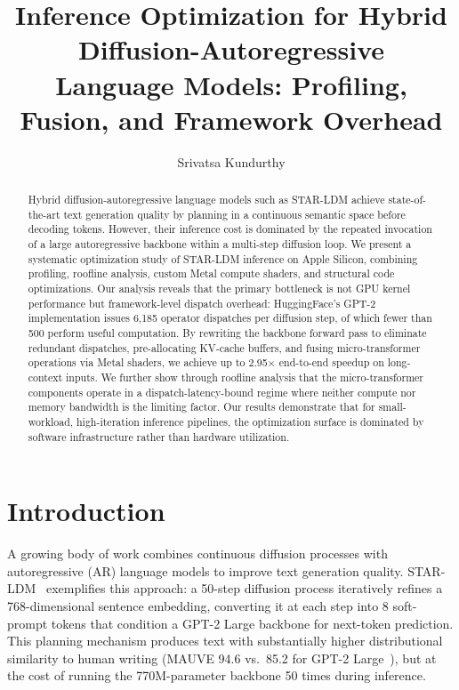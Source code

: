 \documentclass[sigconf,authordraft]{acmart}
\begin{document}
\title{Inference Optimization for Hybrid Diffusion-Autoregressive\\Language Models: Profiling, Fusion, and Framework Overhead}

\author{Srivatsa Kundurthy}

\renewcommand{\shortauthors}{Kundurthy}

\begin{abstract}
Hybrid diffusion-autoregressive language models such as STAR-LDM achieve state-of-the-art text generation quality by planning in a continuous semantic space before decoding tokens. However, their inference cost is dominated by the repeated invocation of a large autoregressive backbone within a multi-step diffusion loop. We present a systematic optimization study of STAR-LDM inference on Apple Silicon, combining profiling, roofline analysis, custom Metal compute shaders, and structural code optimizations. Our analysis reveals that the primary bottleneck is not GPU kernel performance but framework-level dispatch overhead: HuggingFace's GPT-2 implementation issues 6{,}185 operator dispatches per diffusion step, of which fewer than 500 perform useful computation. By rewriting the backbone forward pass to eliminate redundant dispatches, pre-allocating KV-cache buffers, and fusing micro-transformer operations via Metal shaders, we achieve up to 2.95$\times$ end-to-end speedup on long-context inputs. We further show through roofline analysis that the micro-transformer components operate in a dispatch-latency-bound regime where neither compute nor memory bandwidth is the limiting factor. Our results demonstrate that for small-workload, high-iteration inference pipelines, the optimization surface is dominated by software infrastructure rather than hardware utilization.
\end{abstract}

\maketitle

\section{Introduction}

A growing body of work combines continuous diffusion processes with autoregressive (AR) language models to improve text generation quality. STAR-LDM~\cite{lovelace2025star} exemplifies this approach: a 50-step diffusion process iteratively refines a 768-dimensional sentence embedding, converting it at each step into 8 soft-prompt tokens that condition a GPT-2 Large backbone for next-token prediction. This planning mechanism produces text with substantially higher distributional similarity to human writing (MAUVE 94.6 vs.\ 85.2 for GPT-2 Large~\cite{pillutla2021mauve}), but at the cost of running the 770M-parameter backbone 50 times during inference.
\end{document}
